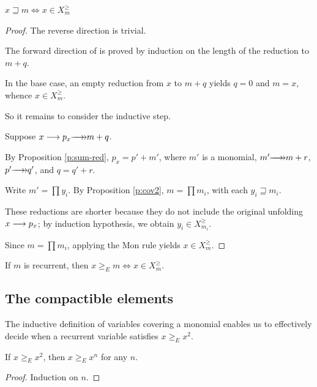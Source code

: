 \documentclass[numbers=enddot]{scrartcl}
\newcommand{\gtE}{\geq_E}
\newcommand{\Xmon}[1]{X^{\scriptscriptstyle{\ge}}_{#1}}
\newcommand{\cov}{\sqsupseteq}
\begin{document}
\begin{prop}
  \label{p:cov1}
  $x \cov m \iff x \in \Xmon{m}$
\end{prop}

\begin{proof}
   The reverse direction is trivial.

  The forward direction of is proved by induction
  on the length of the reduction to $m + q$.

  In the base case, an empty reduction from $x$ to $m + q$
  yields $q = 0$ and $m = x$, whence $x \in \Xmon{m}$.

  So it remains to consider the inductive step.

    Suppose $x \lra p_x \thra m + q$.

    By Proposition \ref{p:sum-red}, $p_x = p' + m'$, where $m'$ is a monomial,
    $m' \thra m + r$, $p' \thra q'$, and $q = q' + r$.

    Write $m' = \prod y_i$.  %
    By Proposition \ref{p:cov2}, $m = \prod m_i$, with each $y_i \cov m_i$.

    These reductions are shorter because they do not include the original unfolding
    $x \mathrel{\longrightarrow} p_x$; by induction hypothesis, we obtain $y_i \in \Xmon{m_i}$.

    Since $m = \prod m_i$, applying the Mon rule yields $x \in \Xmon{m}$.
\end{proof}

\begin{cor} \label{c:recXmon}
  If $m$ is recurrent, then $x \gtE m \iff x \in \Xmon{m}$.
\end{cor}


\subsection{The compactible elements}

The inductive definition of variables covering a monomial enables us to
effectively decide when a recurrent variable satisfies $x \gtE x^2$.

\begin{prop} \label{p:compact-n}
If $x \gtE x^2$, then $x \gtE x^n$ for any $n$.
\end{prop}
\begin{proof}
    Induction on $n$.
\end{proof}
\end{document}
